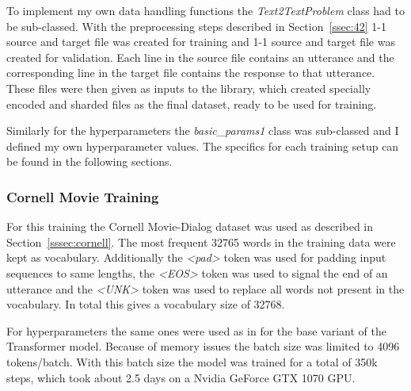 \documentclass[12pt]{article}
\begin{document}
To implement my own data handling functions the \textit{Text2TextProblem} class had to be sub-classed. With the preprocessing steps described in Section~\ref{ssec:42} 1-1 source and target file was created for training and 1-1 source and target file was created for validation. Each line in the source file contains an utterance and the corresponding line in the target file contains the response to that utterance. These files were then given as inputs to the library, which created specially encoded and sharded files as the final dataset, ready to be used for training.

Similarly for the hyperparameters the \textit{basic}\textit{\_}\textit{params1} class was sub-classed and I defined my own hyperparameter values. The specifics for each training setup can be found in the following sections.

\subsubsection{Cornell Movie Training} \label{sssec:cornell_training}
For this training the Cornell Movie-Dialog dataset was used as described in Section~\ref{sssec:cornell}. The most frequent 32765 words in the training data were kept as vocabulary. Additionally the \textit{\textless pad\textgreater} token was used for padding input sequences to same lengths, the \textit{\textless EOS\textgreater} token was used to signal the end of an utterance and the \textit{\textless UNK\textgreater} token was used to replace all words not present in the vocabulary. In total this gives a vocabulary size of 32768.

For hyperparameters the same ones were used as in \cite{Vaswani:2017} for the base variant of the Transformer model. Because of memory issues the batch size was limited to 4096 tokens/batch. With this batch size the model was trained for a total of 350k steps, which took about 2.5 days on a Nvidia GeForce GTX 1070 GPU.
\end{document}

